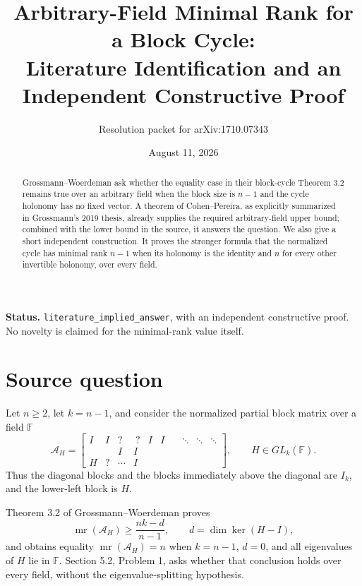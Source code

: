 \documentclass[11pt]{article}
\title{Arbitrary-Field Minimal Rank for a Block Cycle:\\
Literature Identification and an Independent Constructive Proof}
\author{Resolution packet for arXiv:1710.07343}
\date{August 11, 2026}
\newcommand{\F}{\mathbb F}
\newcommand{\mr}{\operatorname{mr}}
\begin{document}
\maketitle

\begin{abstract}
Grossmann--Woerdeman ask whether the equality case in their block-cycle
Theorem 3.2 remains true over an arbitrary field when the block size is
$n-1$ and the cycle holonomy has no fixed vector.  A theorem of
Cohen--Pereira, as explicitly summarized in Grossmann's 2019 thesis, already
supplies the required arbitrary-field upper bound; combined with the lower
bound in the source, it answers the question.  We also give a short independent
construction.  It proves the stronger formula that the normalized cycle has
minimal rank $n-1$ when its holonomy is the identity and $n$ for every other
invertible holonomy, over every field.
\end{abstract}

\noindent\textbf{Status.}
\texttt{literature\_implied\_answer}, with an independent constructive proof.
No novelty is claimed for the minimal-rank value itself.

\section{Source question}

Let $n\geq2$, let $k=n-1$, and consider the normalized partial block matrix
over a field $\F$
\begin{equation}\label{eq:cycle}
 \mathcal A_H=
 \begin{bmatrix}
 I&I&?&\
 ?&I&I&\
 &\ddots&\ddots&\ddots\\
 &&I&I\\
 H&?&\cdots&I
 \end{bmatrix},\qquad H\in GL_k(\F).
\end{equation}
Thus the diagonal blocks and the blocks immediately above the diagonal are
$I_k$, and the lower-left block is $H$.

Theorem 3.2 of Grossmann--Woerdeman \cite{GW} proves
\begin{equation}\label{eq:lower}
 \mr(\mathcal A_H)\geq \frac{nk-d}{n-1},
 \qquad d=\dim\ker(H-I),
\end{equation}
and obtains equality $\mr(\mathcal A_H)=n$ when $k=n-1$, $d=0$, and all
eigenvalues of $H$ lie in $\F$.  Section 5.2, Problem 1, asks whether that
conclusion holds over every field, without the eigenvalue-splitting hypothesis.
\end{document}
